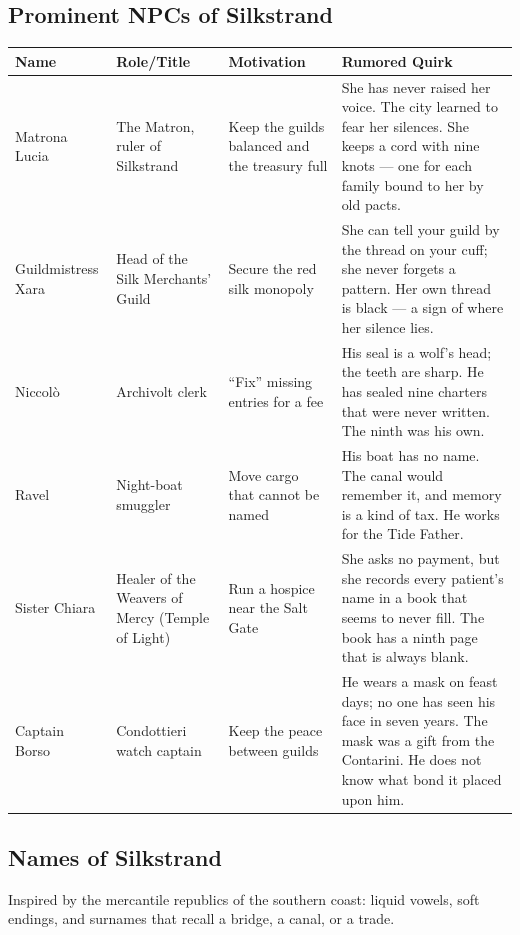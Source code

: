 \subsection*{Prominent NPCs of Silkstrand}
\label{sec:silkstrand-npcs}

\begin{longtable}{|p{}|p{}|p{}|p{}|}
\hline
\textbf{Name} & \textbf{Role/Title} & \textbf{Motivation} & \textbf{Rumored Quirk} \\
\hline
Matrona Lucia & The Matron, ruler of Silkstrand & Keep the guilds balanced and the treasury full & She has never raised her voice. The city learned to fear her silences. She keeps a cord with nine knots --- one for each family bound to her by old pacts. \\
\hline
Guildmistress Xara & Head of the Silk Merchants' Guild & Secure the red silk monopoly & She can tell your guild by the thread on your cuff; she never forgets a pattern. Her own thread is black --- a sign of where her silence lies. \\
\hline
Niccol\`{o} & Archivolt clerk & ``Fix'' missing entries for a fee & His seal is a wolf's head; the teeth are sharp. He has sealed nine charters that were never written. The ninth was his own. \\
\hline
Ravel & Night-boat smuggler & Move cargo that cannot be named & His boat has no name. The canal would remember it, and memory is a kind of tax. He works for the Tide Father. \\
\hline
Sister Chiara & Healer of the Weavers of Mercy (Temple of Light) & Run a hospice near the Salt Gate & She asks no payment, but she records every patient's name in a book that seems to never fill. The book has a ninth page that is always blank. \\
\hline
Captain Borso & Condottieri watch captain & Keep the peace between guilds & He wears a mask on feast days; no one has seen his face in seven years. The mask was a gift from the Contarini. He does not know what bond it placed upon him. \\
\hline
\end{longtable}

\subsection*{Names of Silkstrand}
\label{sec:silkstrand-names}

Inspired by the mercantile republics of the southern coast: liquid vowels, soft endings, and surnames that recall a bridge, a canal, or a trade.

